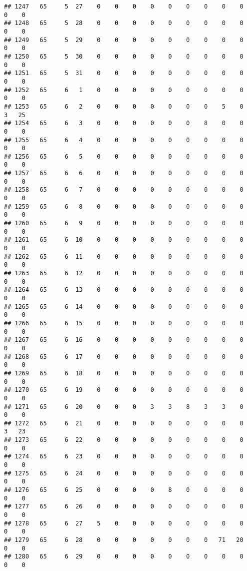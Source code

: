 \documentclass[]{article}
\begin{document}
\begin{verbatim}
## 1247   65     5  27    0    0    0    0    0    0    0    0    0    0    0
## 1248   65     5  28    0    0    0    0    0    0    0    0    0    0    0
## 1249   65     5  29    0    0    0    0    0    0    0    0    0    0    0
## 1250   65     5  30    0    0    0    0    0    0    0    0    0    0    0
## 1251   65     5  31    0    0    0    0    0    0    0    0    0    0    0
## 1252   65     6   1    0    0    0    0    0    0    0    0    0    0    0
## 1253   65     6   2    0    0    0    0    0    0    0    5    0    3   25
## 1254   65     6   3    0    0    0    0    0    0    8    0    0    0    0
## 1255   65     6   4    0    0    0    0    0    0    0    0    0    0    0
## 1256   65     6   5    0    0    0    0    0    0    0    0    0    0    0
## 1257   65     6   6    0    0    0    0    0    0    0    0    0    0    0
## 1258   65     6   7    0    0    0    0    0    0    0    0    0    0    0
## 1259   65     6   8    0    0    0    0    0    0    0    0    0    0    0
## 1260   65     6   9    0    0    0    0    0    0    0    0    0    0    0
## 1261   65     6  10    0    0    0    0    0    0    0    0    0    0    0
## 1262   65     6  11    0    0    0    0    0    0    0    0    0    0    0
## 1263   65     6  12    0    0    0    0    0    0    0    0    0    0    0
## 1264   65     6  13    0    0    0    0    0    0    0    0    0    0    0
## 1265   65     6  14    0    0    0    0    0    0    0    0    0    0    0
## 1266   65     6  15    0    0    0    0    0    0    0    0    0    0    0
## 1267   65     6  16    0    0    0    0    0    0    0    0    0    0    0
## 1268   65     6  17    0    0    0    0    0    0    0    0    0    0    0
## 1269   65     6  18    0    0    0    0    0    0    0    0    0    0    0
## 1270   65     6  19    0    0    0    0    0    0    0    0    0    0    0
## 1271   65     6  20    0    0    0    3    3    8    3    3    0    0    0
## 1272   65     6  21    0    0    0    0    0    0    0    0    0    3   23
## 1273   65     6  22    0    0    0    0    0    0    0    0    0    0    0
## 1274   65     6  23    0    0    0    0    0    0    0    0    0    0    0
## 1275   65     6  24    0    0    0    0    0    0    0    0    0    0    0
## 1276   65     6  25    0    0    0    0    8    0    0    0    0    0    0
## 1277   65     6  26    0    0    0    0    0    0    0    0    0    0    0
## 1278   65     6  27    5    0    0    0    0    0    0    0    0    0    0
## 1279   65     6  28    0    0    0    0    0    0    0   71   20    0    0
## 1280   65     6  29    0    0    0    0    0    0    0    0    0    0    0

\end{verbatim}
\end{document}
